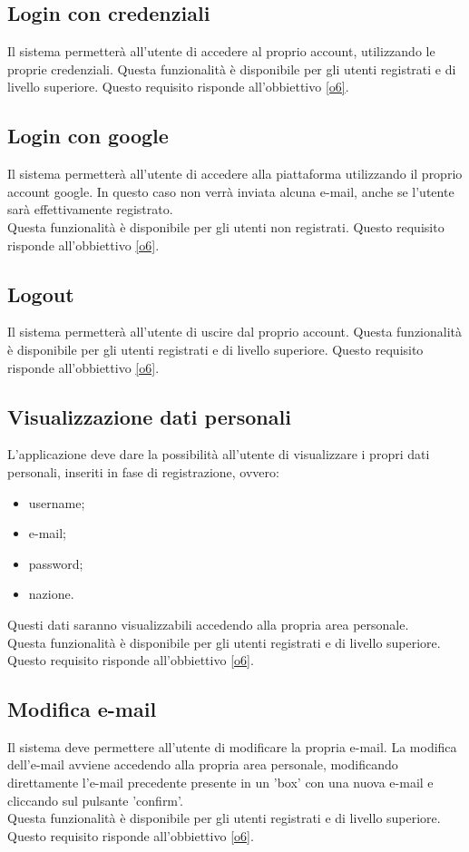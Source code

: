 \subsection{Login con credenziali} \label{req_login_con credenziali}
Il sistema permetterà all'utente di accedere al proprio account, utilizzando le proprie credenziali. Questa funzionalità è disponibile per gli utenti registrati e di livello superiore. Questo requisito risponde all'obbiettivo \ref{o6}. 

\subsection{Login con google} \label{req_login_con_google}
Il sistema permetterà all'utente di accedere alla piattaforma utilizzando il proprio account google. In questo caso non verrà inviata alcuna e-mail, anche se l'utente sarà effettivamente registrato. \\
Questa funzionalità è disponibile per gli utenti non registrati. Questo requisito risponde all'obbiettivo \ref{o6}. 

\subsection{Logout} \label{req_logout}
Il sistema permetterà all'utente di uscire dal proprio account. Questa funzionalità è disponibile per gli utenti registrati e di livello superiore. Questo requisito risponde all'obbiettivo \ref{o6}. 

\subsection{Visualizzazione dati personali} \label{req_visualizzazione_dati_personali}
L'applicazione deve dare la possibilità all'utente di visualizzare i propri dati personali, inseriti in fase di registrazione, ovvero:
\begin{itemize}
    \item username;
    \item e-mail;
    \item password;
    \item nazione.
\end{itemize}
Questi dati saranno visualizzabili accedendo alla propria area personale. \\
Questa funzionalità è disponibile per gli utenti registrati e di livello superiore. Questo requisito risponde all'obbiettivo \ref{o6}. 

\subsection{Modifica e-mail} \label{req_modifica_email} 
Il sistema deve permettere all'utente di modificare la propria e-mail. La modifica dell'e-mail avviene accedendo alla propria area personale, modificando direttamente l'e-mail precedente presente in un 'box' con una nuova e-mail e cliccando sul pulsante 'confirm'. \\
Questa funzionalità è disponibile per gli utenti registrati e di livello superiore. Questo requisito risponde all'obbiettivo \ref{o6}. 

